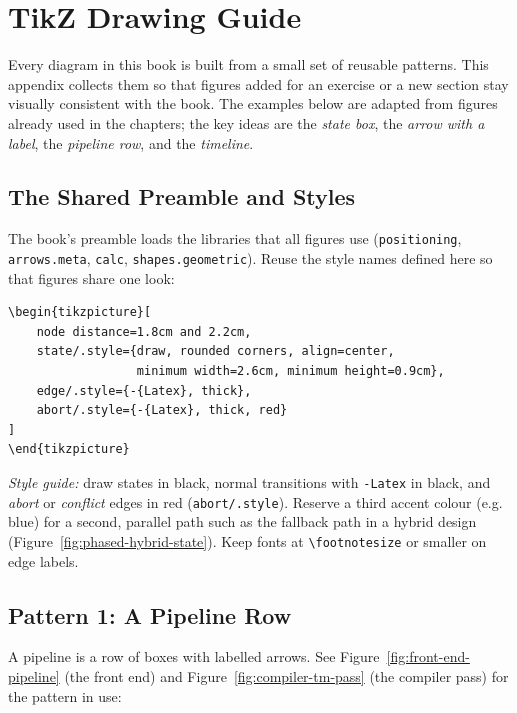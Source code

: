 \chapter{TikZ Drawing Guide}
\label{chap:tikz-guide}

Every diagram in this book is built from a small set of reusable patterns.
This appendix collects them so that figures added for an exercise or a new
section stay visually consistent with the book.  The examples below are
adapted from figures already used in the chapters; the key ideas are the
\emph{state box}, the \emph{arrow with a label}, the \emph{pipeline row},
and the \emph{timeline}.

\section{The Shared Preamble and Styles}

The book's preamble loads the libraries that all figures use
(\texttt{positioning}, \texttt{arrows.meta}, \texttt{calc},
\texttt{shapes.geometric}).  Reuse the style names defined here so that
figures share one look:

\begin{lstlisting}[language={}, caption={Common TikZ styles used throughout the book.}]
\begin{tikzpicture}[
    node distance=1.8cm and 2.2cm,
    state/.style={draw, rounded corners, align=center,
                  minimum width=2.6cm, minimum height=0.9cm},
    edge/.style={-{Latex}, thick},
    abort/.style={-{Latex}, thick, red}
]
\end{tikzpicture}
\end{lstlisting}

\emph{Style guide:} draw states in black, normal transitions with
\texttt{-{Latex}} in black, and \emph{abort} or \emph{conflict} edges in
red (\texttt{abort/.style}).  Reserve a third accent colour (e.g. blue) for
a second, parallel path such as the fallback path in a hybrid design
(Figure~\ref{fig:phased-hybrid-state}).  Keep fonts at
\texttt{\textbackslash footnotesize} or smaller on edge labels.

\section{Pattern 1: A Pipeline Row}

A pipeline is a row of boxes with labelled arrows.  See
Figure~\ref{fig:front-end-pipeline} (the front end) and
Figure~\ref{fig:compiler-tm-pass} (the compiler pass) for the pattern in
use:

